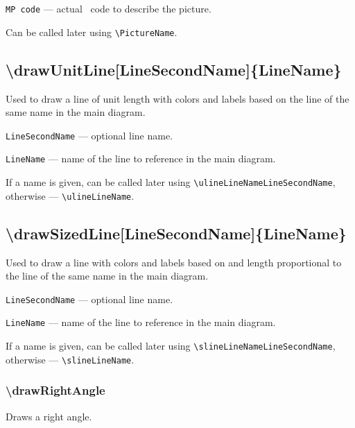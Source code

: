 \documentclass{ltxdoc}
\begin{document}
	\texttt{MP code} — actual \METAPOST\ code to describe the picture.
	
	Can be called later using \texttt{\textbackslash PictureName}.


\subsection{\textbackslash drawUnitLine[LineSecondName]\{LineName\}}

	Used to draw a line of unit length with colors and labels based on the line of the same name in the main diagram.

	\texttt{LineSecondName} — optional line name.
	
	\texttt{LineName} — name of the line to reference in the main diagram. 

	If a name is given, can be called later using \texttt{\textbackslash ulineLineNameLineSecondName}, otherwise — \texttt{\textbackslash ulineLineName}. 
	

\subsection{\textbackslash drawSizedLine[LineSecondName]\{LineName\}}

	Used to draw a line with colors and labels based on and length proportional to the line of the same name in the main diagram.

	\texttt{LineSecondName} — optional line name. 
	
	\texttt{LineName} — name of the line to reference in the main diagram. 
	
	If a name is given, can be called later using \texttt{\textbackslash slineLineNameLineSecondName}, otherwise — \texttt{\textbackslash slineLineName}. 






\subsubsection{\textbackslash drawRightAngle}

	Draws a right angle.
\end{document}
